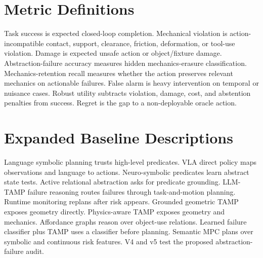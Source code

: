 \documentclass[11pt]{article}
\begin{document}
\section{Metric Definitions}
Task success is expected closed-loop completion. Mechanical violation is action-incompatible contact, support, clearance, friction, deformation, or tool-use violation. Damage is expected unsafe action or object/fixture damage. Abstraction-failure accuracy measures hidden mechanics-erasure classification. Mechanics-retention recall measures whether the action preserves relevant mechanics on actionable failures. False alarm is heavy intervention on temporal or nuisance cases. Robust utility subtracts violation, damage, cost, and abstention penalties from success. Regret is the gap to a non-deployable oracle action.

\section{Expanded Baseline Descriptions}
Language symbolic planning trusts high-level predicates. VLA direct policy maps observations and language to actions. Neuro-symbolic predicates learn abstract state tests. Active relational abstraction asks for predicate grounding. LLM-TAMP failure reasoning routes failures through task-and-motion planning. Runtime monitoring replans after risk appears. Grounded geometric TAMP exposes geometry directly. Physics-aware TAMP exposes geometry and mechanics. Affordance graphs reason over object-use relations. Learned failure classifier plus TAMP uses a classifier before planning. Semantic MPC plans over symbolic and continuous risk features. V4 and v5 test the proposed abstraction-failure audit.
\end{document}
